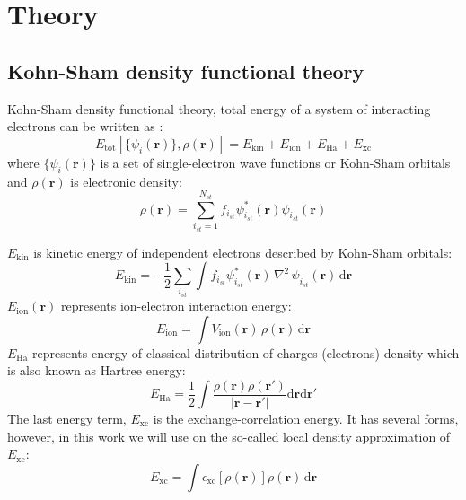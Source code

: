 \section{Theory}

\subsection{Kohn-Sham density functional theory}

Kohn-Sham density functional theory, total energy of a system of interacting
electrons can be written as \cite{Kohn1965}:
\begin{equation}
E_{\mathrm{tot}}\left[\{\psi_{i}(\mathbf{r})\},\rho(\mathbf{r})\right] =
E_{\mathrm{kin}} + E_{\mathrm{ion}} + E_{\mathrm{Ha}} + E_{\mathrm{xc}}
\label{eq:KS_ene_func}
\end{equation}
where $\{\psi_{i}(\mathbf{r})\}$ is a set of single-electron wave functions or
Kohn-Sham orbitals
and $\rho(\mathbf{r})$ is electronic density:
\begin{equation}
\rho(\mathbf{r}) = \sum_{i_{st} = 1}^{N_{st}} f_{i_{st}} \psi^{*}_{i_{st}}(\mathbf{r})
\psi_{i_{st}}(\mathbf{r})
\end{equation}

$E_{\mathrm{kin}}$ is kinetic energy of independent electrons described by
Kohn-Sham orbitals:
\begin{equation}
E_{\mathrm{kin}} = -\frac{1}{2}\sum_{i_{st}}
\int f_{i_{st}}
\psi_{i_{st}}^{*}(\mathbf{r})\,\nabla^2\,\psi_{i_{st}}(\mathbf{r})
\,\mathrm{d}\mathbf{r}
\end{equation}
%
$E_{\mathrm{ion}}(\mathbf{r})$ represents ion-electron interaction energy:
\begin{equation}
E_{\mathrm{ion}} = \int V_{\mathrm{ion}}(\mathbf{r})\, \rho(\mathbf{r})\,
\mathrm{d}\mathbf{r}
\end{equation}
%
$E_{\mathrm{Ha}}$ represents energy of classical distribution
of charges (electrons) density which is also known as Hartree energy:
\begin{equation}
E_{\mathrm{Ha}} = \frac{1}{2} \int 
\dfrac{\rho(\mathbf{r})\rho(\mathbf{r}')}
{\left|\mathbf{r} - \mathbf{r}'\right|}
\mathrm{d}\mathbf{r}\mathrm{d}\mathbf{r}'
\end{equation}
%
The last energy term, $E_{\mathrm{xc}}$ is the exchange-correlation energy.
It has several forms, however, in this work we will use on the so-called
local density approximation of $E_{\mathrm{xc}}$:
\begin{equation}
E_{\mathrm{xc}} = \int \epsilon_{\mathrm{xc}}\left[\rho(\mathbf{r})\right]
\rho(\mathbf{r})\,\mathrm{d}\mathbf{r}
\end{equation}

